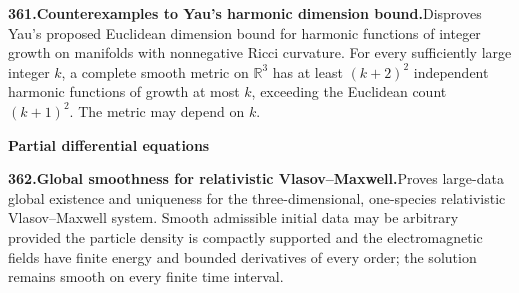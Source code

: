 \documentclass[11pt,a4paper]{article}
\begin{document}
  \par \begin{minipage}{\linewidth}
  \fontsize{10.5}{12.6}\selectfont\RaggedRight
  \hypertarget{result 361}{}
  {\bfseries\textcolor{muted}{361.}\enspace Counterexamples to Yau's harmonic dimension bound.}\enspace Disproves Yau's proposed Euclidean dimension bound for harmonic functions of integer growth on manifolds with nonnegative Ricci curvature. For every sufficiently large integer $k$, a complete smooth metric on $\mathbb R^3$ has at least $(k+2)^2$ independent harmonic functions of growth at most $k$, exceeding the Euclidean count $(k+1)^2$. The metric may depend on $k$.\par
  \end{minipage}\par\vspace{5pt}



  \par{}\addvspace{12pt}
  \hypertarget{subject 9}{}\label{subject 9}
  {\fontsize{15}{18}\selectfont\bfseries Partial differential equations\par}
  \nobreak\vspace{9pt}\nobreak



  \par \begin{minipage}{\linewidth}
  \fontsize{10.5}{12.6}\selectfont\RaggedRight
  \hypertarget{result 362}{}
  {\bfseries\textcolor{muted}{362.}\enspace Global smoothness for relativistic Vlasov--Maxwell.}\enspace Proves large-data global existence and uniqueness for the three-dimensional, one-species relativistic Vlasov--Maxwell system. Smooth admissible initial data may be arbitrary provided the particle density is compactly supported and the electromagnetic fields have finite energy and bounded derivatives of every order; the solution remains smooth on every finite time interval.\par
  \end{minipage}\par\vspace{5pt}
\end{document}
